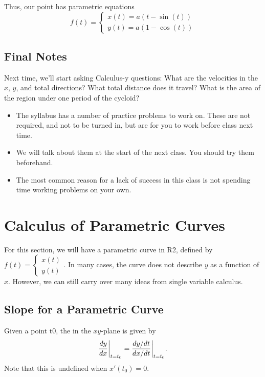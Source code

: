 Thus, our point has parametric equations
\[
    f(t) = \begin{cases}
        x(t) = a(t - \sin(t)) \\
        y(t) = a(1 - \cos(t))
    \end{cases}
\]

\subsection{Final Notes}

Next time, we'll start asking Calculus-y questions: What are the velocities in the \(x\), \(y\), and total directions? What total distance does it travel? What is the area of the region under one period of the cycloid?
\begin{itemize}
    \item The syllabus has a number of practice problems to work on. These are not required, and not to be
          turned in, but are for you to work before class next time.
    \item We will talk about them at the start of the next class. You should try them beforehand.
    \item The most common reason for a lack of success in this class is not spending time working problems on
          your own.
\end{itemize}

\section{Calculus of Parametric Curves}

For this section, we will have a parametric curve in R2, defined by \(f(t) = \begin{cases}
    x(t) \\
    y(t)
\end{cases}.\) 
In many cases, the curve does not describe \(y\) as a function of \(x\). However, we can still carry over many ideas from single variable calculus.

\subsection{Slope for a Parametric Curve}

Given a point t0, the  in the \(xy\)-plane is given by
\[
    \dfrac{dy}{dx}\bigg|_{t = t_{0}} = \frac{dy/dt}{dx/dt}\bigg|_{t = t_{0}}. \\
\]
Note that this is undefined when \(x'(t_{0}) = 0\). \\

